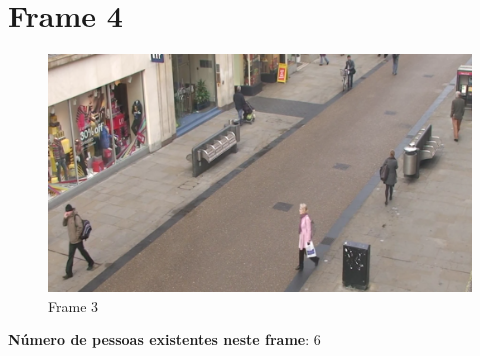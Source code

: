 \section{Frame 4}

\begin{figure}[h]
	\centering
	\includegraphics[width=0.5\linewidth]{img/vision/frame4.png}
	\caption{Frame 3 }
	\label{db}
\end{figure}

\textbf{Número de pessoas existentes neste frame}: 6


